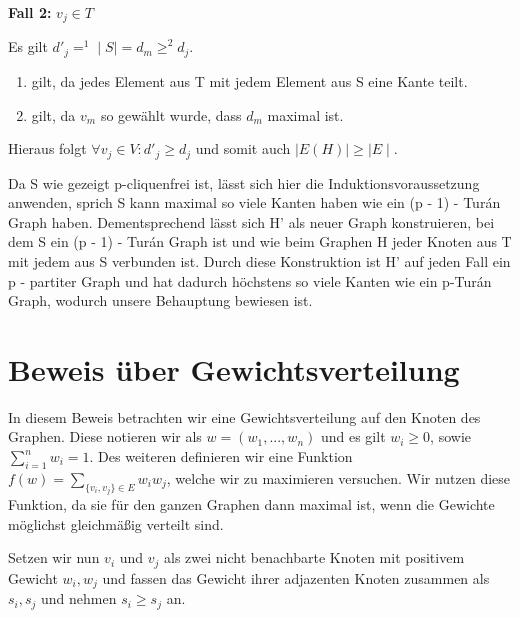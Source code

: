\documentclass[12pt, a4paper]{article}
\begin{document}
\textbf{Fall 2:} $v_j \in T$

Es gilt $d'_j =^1 \mid S \mid = d_m \ge^2 d_j$.
\begin{enumerate}
\item {}
gilt, da jedes Element aus T mit jedem Element aus S eine Kante teilt.

\item {}
gilt, da $v_m$ so gewählt wurde, dass $d_m$ maximal ist.

\end{enumerate}

Hieraus folgt $\forall v_j \in V: d'_j \ge d_j$ und somit auch $\mid E(H) \mid \ge \mid E \mid$.

Da S wie gezeigt p-cliquenfrei ist, lässt sich hier die Induktionsvoraussetzung anwenden, sprich S kann maximal so viele Kanten haben wie ein (p - 1) - Turán Graph haben. Dementsprechend lässt sich H' als neuer Graph konstruieren, bei dem S ein (p - 1) - Turán Graph ist und wie beim Graphen H jeder Knoten aus T mit jedem aus S verbunden ist. Durch diese Konstruktion ist H' auf jeden Fall ein p - partiter Graph und hat dadurch höchstens so viele Kanten wie ein p-Turán Graph, wodurch unsere Behauptung bewiesen ist.


\section{Beweis über Gewichtsverteilung}
\label{proof/third::doc}\label{proof/third:dritter-beweis-gewichtsverteilung}
In diesem Beweis betrachten wir eine Gewichtsverteilung auf den Knoten des Graphen. Diese notieren wir als $w = (w_1,...,w_n)$ und es gilt $w_i \ge 0$, sowie $\sum^n_{i=1}w_i = 1$. Des weiteren definieren wir eine Funktion $f(w) = \sum_{ \{v_i, v_j\} \in E} w_i w_j$, welche wir zu maximieren versuchen. Wir nutzen diese Funktion, da sie für den ganzen Graphen dann maximal ist, wenn die Gewichte möglichst gleichmäßig verteilt sind.

Setzen wir nun $v_i$ und $v_j$ als zwei nicht benachbarte Knoten mit positivem Gewicht $w_i, w_j$ und fassen das Gewicht ihrer adjazenten Knoten zusammen als $s_i, s_j$ und nehmen $s_i \ge s_j$ an.
\end{document}
